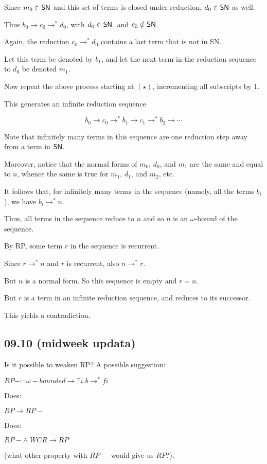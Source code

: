 \documentclass{scrartcl}
\begin{document}
\begin{itemize}
  Since $m_0 \in \mathsf{SN}$ and this set of terms is closed under reduction, $d_0 \in \mathsf{SN}$ as well.

  Thus $b_0 \to c_0 \to^* d_0$, with $d_0 \in \mathsf{SN}$, and $c_0 \notin \mathsf{SN}$.

  Again, the reduction $c_0 \to^* d_0$ contains a last term that is not in SN.

  Let this term be denoted by $b_1$, and let the next term in the reduction sequence
  to $d_0$ be denoted $m_1$.

  Now repeat the above process starting at $(\star)$, incrementing all subscripts by 1.

  This generates an infinite reduction sequence

  \[b_0 \to c_0 \to^* b_1 \to c_1 \to^* b_2 \to \cdots \]

  Note that infinitely many terms in this sequence are one reduction step
  away from a term in $\mathsf{SN}$.

  Moreover, notice that the normal forms of $m_0$, $d_0$, and $m_1$ are the same
  and equal to $n$, whence the same is true for $m_1$, $d_1$, and $m_2$, etc.

  It follows that, for infinitely many terms in the sequence
  (namely, all the terms $b_i$), we have $b_i \to^* n$.

  Thus, all terms in the sequence reduce to $n$ and so $n$ is an $\omega$-bound
  of the sequence.

  By RP, some term $r$ in the sequence is recurrent.

  Since $r \to^* n$ and $r$ is recurrent, also $n \to^* r$.

  But $n$ is a normal form.  So this sequence is empty and $r=n$.

  But $r$ is a term in an infinite reduction sequence, and reduces to its successor.

  This yields a contradiction.

\end{itemize}
\subsection{09.10 (midweek updata)}
Is it possible to weaken RP? A possible suggestion:

$RP- :: \omega-bounded \to  \exists i. b \to^* f i$

Does:

$RP \to RP-$

Does:

$RP- \land \; WCR \to RP$

(what other property with $RP-$ would give us $RP$?).
\end{document}
